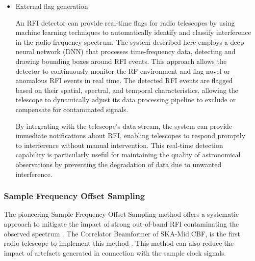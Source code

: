 \begin{itemize}
\item External flag generation

An RFI detector can provide real-time flags for radio telescopes by using machine learning techniques to automatically identify and classify interference in the radio frequency spectrum. The system described here \citep{9111666} employs a deep neural network (DNN) that processes time-frequency data, detecting and drawing bounding boxes around RFI events. This approach allows the detector to continuously monitor the RF environment and flag novel or anomalous RFI events in real time. The detected RFI events are flagged based on their spatial, spectral, and temporal characteristics, allowing the telescope to dynamically adjust its data processing pipeline to exclude or compensate for contaminated signals.

By integrating with the telescope’s data stream, the system can provide immediate notifications about RFI, enabling telescopes to respond promptly to interference without manual intervention. This real-time detection capability is particularly useful for maintaining the quality of astronomical observations by preventing the degradation of data due to unwanted interference.



\end{itemize}

\subsubsection{Sample Frequency Offset Sampling}

The pioneering Sample Frequency Offset Sampling method offers a systematic approach to mitigate the impact of strong out-of-band RFI contaminating the observed spectrum \citep{carlson_scfo_2017}. The Correlator Beamformer of SKA-Mid.CBF, is the first radio telescope to implement this method \citep{ska_mid_cbf_rfi_2019}. This method can also reduce the impact of artefacts generated in connection with the sample clock signals. 

